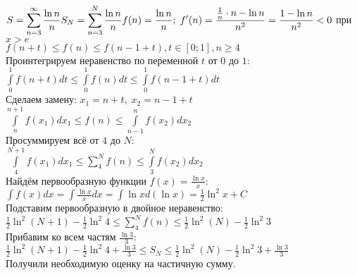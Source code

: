     \begin{problem}
        $\displaystyle
        S = \sum\limits_{n=3}^{\infty}\frac{\ln n}{n}\\[3pt]
        S_N = \sum\limits_{n=3}^{N}\frac{\ln n}{n}
        f(n) = \frac{\ln n}{n};\; f'(n) = \frac{\frac{1}{n}\cdot n - \ln n}{n^2} = \frac{1 - \ln n}{n^2} < 0$ при
        $\displaystyle
        x > e
        $\\[3pt]
        $\displaystyle
        f(n + t) \leq f(n) \leq f(n - 1 + t), t \in [0; 1], n\geq 4
        $\\[3pt]
        Проинтегрируем неравенство по переменной $t$ от $0$ до $1$:\\[3pt]
        $\displaystyle
        \int\limits_{0}^1 f(n + t)dt \leq \int\limits_{0}^1 f(n)dt \leq \int\limits_{0}^{1} f(n-1+t)dt
        $\\[3pt]
        Сделаем замену:
        $\displaystyle
        x_1 = n + t,\; x_2 = n - 1 + t
        $\\[3pt]
        $\displaystyle
        \int\limits_{n}^{n+1} f(x_1)dx_1 \leq f(n) \leq \int\limits_{n-1}^{n} f(x_2)dx_2
        $\\[3pt]
        Просуммируем всё от $4$ до $N$:\\[3pt]
        $\displaystyle
        \int\limits_{4}^{N+1} f(x_1)dx_1 \leq \sum\limits_4^Nf(n) \leq \int\limits_{3}^{N} f(x_2)dx_2
        $\\[3pt]
        Найдём первообразную функции $f(x) = \frac{\ln x}{x}$:\\[3pt]
        $\displaystyle
        \int f(x)dx = \int\frac{\ln x}{x}dx = \int\ln xd(\ln x) = \frac{1}{2}\ln^{2}x + C
        $\\[3pt]
        Подставим первообразную в двойное неравенство:\\[3pt]
        $\displaystyle
        \frac{1}{2}\ln^2(N + 1) - \frac{1}{2}\ln^{2}4 \leq \sum\limits_4^Nf(n) \leq
        \frac{1}{2}\ln^2(N) - \frac{1}{2}\ln^{2}3
        $\\[3pt]
        Прибавим ко всем частям $\frac{\ln3}{3}$:\\[3pt]
        $\displaystyle
        \frac{1}{2}\ln^2(N + 1) - \frac{1}{2}\ln^{2}4 + \frac{\ln3}{3} \leq
        S_N \leq
        \frac{1}{2}\ln^2(N) - \frac{1}{2}\ln^{2}3 + \frac{\ln3}{3}
        $\\[3pt]
        Получили необходимую оценку на частичную сумму.
    \end{problem}
